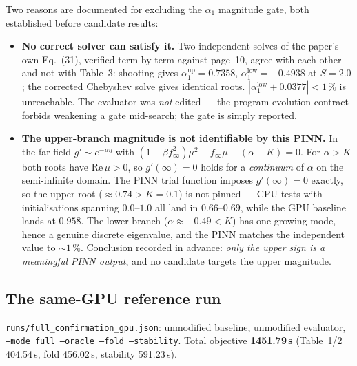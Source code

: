 \documentclass[11pt,a4paper]{article}
\newcommand{\code}[1]{\texttt{\small #1}}
\newcommand{\pct}{\,\%}
\begin{document}
\noindent Two reasons are documented for excluding the $\alpha_1$ magnitude gate, both
established before candidate results:

\begin{itemize}[leftmargin=1.4em,itemsep=2pt]
  \item \textbf{No correct solver can satisfy it.} Two independent solves of the paper's own
        Eq.~(31), verified term-by-term against page~10, agree with each other and not with
        Table~3: shooting gives $\alpha_1^{\mathrm{up}}=0.7358$,
        $\alpha_1^{\mathrm{low}}=-0.4938$ at $S{=}2.0$; the corrected Chebyshev solve gives
        identical roots. $|\alpha_1^{\mathrm{low}} + 0.0377| < 1\pct$ is unreachable. The
        evaluator was \emph{not} edited --- the program-evolution contract forbids weakening
        a gate mid-search; the gate is simply reported.
  \item \textbf{The upper-branch magnitude is not identifiable by this PINN.} In the far
        field $g'\sim e^{-\mu\eta}$ with
        $(1-\beta f_\infty^2)\mu^2 - f_\infty\mu + (\alpha-K) = 0$. For $\alpha > K$ both
        roots have $\mathrm{Re}\,\mu>0$, so $g'(\infty)=0$ holds for a \emph{continuum} of
        $\alpha$ on the semi-infinite domain. The PINN trial function imposes
        $g'(\infty)=0$ exactly, so the upper root ($\approx 0.74 > K = 0.1$) is not pinned
        --- CPU tests with initialisations spanning $0.0$--$1.0$ all land in $0.66$--$0.69$,
        while the GPU baseline lands at $0.958$. The lower branch
        ($\alpha\approx-0.49 < K$) has one growing mode, hence a genuine discrete
        eigenvalue, and the PINN matches the independent value to ${\sim}1\pct$. Conclusion
        recorded in advance: \emph{only the upper sign is a meaningful PINN output}, and no
        candidate targets the upper magnitude.
\end{itemize}

\subsection{The same-GPU reference run}
\code{runs/full\_confirmation\_gpu.json}: unmodified baseline, unmodified evaluator,
\code{--mode full --oracle --fold --stability}. Total objective \textbf{1451.79\,s}
(Table~1/2 404.54\,s, fold 456.02\,s, stability 591.23\,s).
\end{document}

